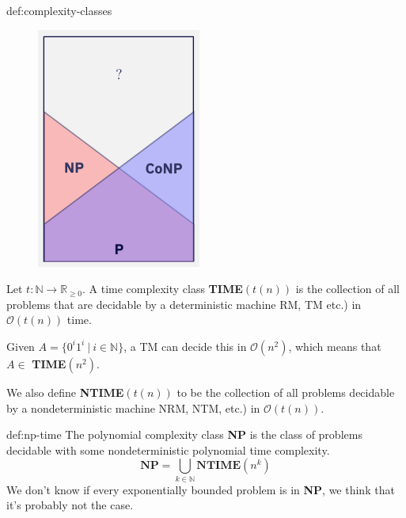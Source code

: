 \documentclass[landscape, 8pt]{extarticle}
\begin{document}
\begin{multicols}{3}
\begin{dfn}{def:complexity-classes}{}

\setlength{\columnsep}{0pt}
\begin{figure}
    \centering
    \includegraphics[width=0.7\linewidth]{images/basic-complexity-classes.png}
\end{figure}

Let $t:\mathbb{N} \to \mathbb{R}_{\geq 0}$. A time complexity class \textbf{TIME}$(t(n))$ is the collection of all problems that are decidable by a deterministic machine RM, TM etc.) in $\mathcal{O}(t(n))$ time.

Given $A = \{0^i1^i \:|\: i \in \mathbb{N}\}$, a TM can decide this in $\mathcal{O}(n^2)$, which means that $A \in$ \textbf{TIME}$(n^2)$.

We also define \textbf{NTIME}$(t(n))$ to be the collection of all problems decidable by a nondeterministic machine NRM, NTM, etc.) in $\mathcal{O}(t(n))$.
\end{dfn}

\begin{dfn}{def:np-time}{}
The polynomial complexity class \textbf{NP} is the class of problems decidable with some nondeterministic polynomial time complexity.
\[\textbf{NP} = \bigcup_{k \in \mathbb{N}} \textbf{NTIME}(n^k)\]
\newline
We don't know if every exponentially bounded problem is in \textbf{NP}, we think that it's probably not the case.


\end{dfn}
\end{multicols}
\end{document}
